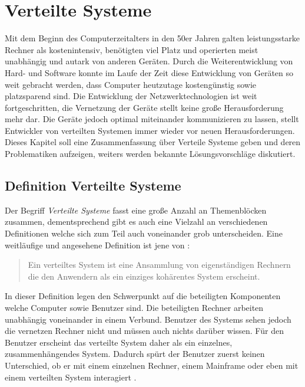 \chapter{Verteilte Systeme}\label{cha:distributedSystems}
Mit dem Beginn des Computerzeitalters in den 50er Jahren galten leistungsstarke Rechner als kostenintensiv, benötigten viel Platz und operierten meist unabhängig und autark von anderen Geräten. Durch die Weiterentwicklung von Hard- und Software konnte im Laufe der Zeit diese Entwicklung von Geräten so weit gebracht werden, dass Computer heutzutage kostengünstig sowie platzsparend sind. Die Entwicklung der Netzwerktechnologien ist  weit fortgeschritten, die Vernetzung der Geräte stellt keine große Herausforderung mehr dar. Die Geräte jedoch optimal miteinander kommunizieren zu lassen, stellt Entwickler von verteilten Systemen immer wieder vor neuen Herausforderungen. \citep{tanenbaum2007distributed} \\
Dieses Kapitel soll eine Zusammenfassung über Verteile Systeme geben und deren Problematiken aufzeigen, weiters werden bekannte Lösungsvorschläge diskutiert.

\section{Definition Verteilte Systeme}\label{sec:distributedSystems:definition}
Der Begriff \textit{Verteilte Systeme} fasst eine große Anzahl an Themenblöcken zusammen, dementsprechend gibt es auch eine Vielzahl an verschiedenen Definitionen welche sich zum Teil auch voneinander grob unterscheiden. Eine weitläufige und angesehene Definition ist jene von \cite{tanenbaum2007distributed}:
\begin{quote}
    Ein verteiltes System ist eine Ansammlung von eigenständigen Rechnern die den Anwendern als ein einziges kohärentes System erscheint.
    \label{quote:distributedSystem:tanenbaum}
\end{quote}
In dieser Definition legen \cite{tanenbaum2007distributed} den Schwerpunkt auf die beteiligten Komponenten welche Computer sowie Benutzer sind. Die beteiligten Rechner arbeiten unabhängig voneinander in einem Verbund. Benutzer des Systems sehen jedoch die vernetzen Rechner nicht und müssen auch nichts darüber wissen. Für den Benutzer erscheint das verteilte System daher als ein einzelnes, zusammenhängendes System. Dadurch spürt der Benutzer zuerst keinen Unterschied, ob er mit einem einzelnen Rechner, einem Mainframe oder eben mit einem verteilten System interagiert \citep{tanenbaum2007distributed}. \\
% 
% 


